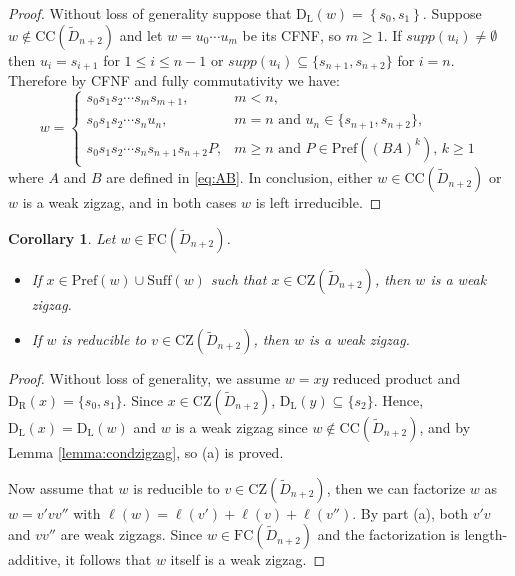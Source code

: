 \documentclass{amsart}
\newcommand{\D}{{\widetilde{D}_{n+2}}}
\newcommand{\ld}{{\mathrm{D}_{\mathrm{L}}}}
\newcommand{\rd}{{\mathrm{D}_{\mathrm{R}}}}
\newcommand{\fc}{{\mathrm{FC}}}
\newcommand{\s}{{s_{\bullet}}}
\newcommand{\su}{\mathrm{Suff}}
\newcommand{\pr}{\mathrm{Pref}}
\newcommand{\TTC}{\mathrm{CC}}
\newcommand{\zz}{\mathrm{CZ}}
\newcommand{\fzp}{A}
\newcommand{\fzs}{B}
\newtheorem{Corollary}[Theorem]{Corollary}
\theoremstyle{definition}
\begin{document}
\begin{proof}
Without loss of generality suppose that $\ld(w) = \left\{ s_0, s_1 \right\}$. Suppose $w\notin \TTC(\D)$ and let $w=u_0\cdots u_m$ be its CFNF, so $m\ge 1$. If $supp(u_i)\ne \emptyset$ then $u_i=s_{i+1}$ for $1\le i\le n-1$ or $supp(u_i)\subseteq \{s_{n+1}, s_{n+2}\}$ for $i=n$. Therefore by CFNF and fully commutativity we have: \[w=\begin{cases}
    s_0s_1s_2\cdots s_{m}s_{m+1}, & m<n, \\ s_0s_1s_2\cdots s_n u_n, & m=n \mbox{ and } u_n\in \{s_{n+1},s_{n+2}\}, \\ s_0s_1s_2\cdots s_ns_{n+1}s_{n+2}P, & m\ge  n \mbox{ and } P\in \pr((\fzs \fzp)^k)\mbox{, } k\ge 1
    \end{cases}\] 
 where $A$ and $B$ are defined in \eqref{eq:AB}. In conclusion, either $w\in \TTC(\D)$ or $w$ is a weak zigzag, and in both cases $w$ is left irreducible.
\end{proof}

 


\begin{Corollary}
\label{corollary:precompzigzag}
Let $w\in \fc(\D)$. 
\begin{itemize}
    \item[(a)] If $x\in \pr(w)\cup \su(w)$ such that $x\in \zz(\D)$, then $w$ is a weak zigzag. 
    \item[(b)] If $w$ is reducible to $v\in \zz(\D)$, then $w$ is a weak zigzag. 
\end{itemize}

\end{Corollary}

\begin{proof}
Without loss of generality, we assume $w=xy$ reduced product and $\rd(x)=\{s_0,s_1\}$. Since $x\in \zz(\D)$, $\ld(y)\subseteq \{s_2\}$. Hence, $\ld(x)=\ld(w)$ and $w$ is a weak zigzag since $w\notin \TTC(\D)$, and by Lemma \ref{lemma:condzigzag}, so (a) is proved.

Now assume that $w$ is reducible to $v\in\zz(\D)$, then we can factorize $w$ as $w=v'vv''$ with $\ell(w)=\ell(v')+\ell(v)+\ell(v'')$. 
By part (a), both $v'v$ and $vv''$ are weak zigzags. Since $w\in \fc(\D)$  and the factorization is length-additive, it follows that 
$w$ itself is a weak zigzag.
\end{proof}
\end{document}
